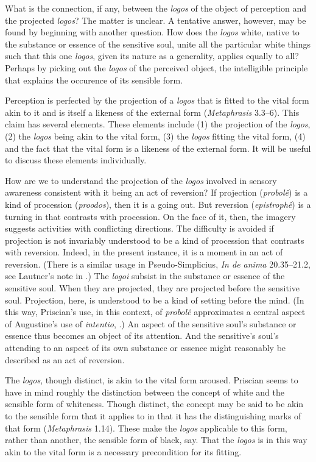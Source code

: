 \documentclass[12pt]{article}
\begin{document}
What is the connection, if any, between the \emph{logos} of the object of perception and the projected \emph{logos}? The matter is unclear. A tentative answer, however, may be found by beginning with another question. How does the \emph{logos} white, native to the substance or essence of the sensitive soul, unite all the particular white things such that this one \emph{logos}, given its nature as a generality, applies equally to all? Perhaps by picking out the \emph{logos} of the perceived object, the intelligible principle that explains the occurence of its sensible form.

Perception is perfected by the projection of a \emph{logos} that is fitted to the vital form akin to it and is itself a likeness of the external form (\emph{Metaphrasis} 3.3--6). This claim has several elements. These elements include (1) the projection of the \emph{logos}, (2) the \emph{logos} being akin to the vital form, (3) the \emph{logos} fitting the vital form, (4) and the fact that the vital form is a likeness of the external form. It will be useful to discuss these elements individually.

How are we to understand the projection of the \emph{logos} involved in sensory awareness consistent with it being an act of reversion? If projection (\emph{probolê}) is a kind of procession (\emph{proodos}), then it is a going out. But reversion (\emph{epistrophê}) is a turning in that contrasts with procession. On the face of it, then, the imagery suggests activities with conflicting directions. The difficulty is avoided if projection is not invariably understood to be a kind of procession that contrasts with reversion. Indeed, in the present instance, it is a moment in an act of reversion. (There is a similar usage in Pseudo-Simplicius, \emph{In de anima} 20.35--21.2, see Lautner's note in \citealt[164--165 n.94]{Urmson:2013vf}.) The \emph{logoi} subsist in the substance or essence of the sensitive soul. When they are projected, they are projected before the sensitive soul. Projection, here, is understood to be a kind of setting before the mind. (In this way, Priscian's use, in this context, of \emph{probolê} approximates a central aspect of Augustine's use of \emph{intentio}, \citealt[84--87]{ODaly:1987fq}.) An aspect of the sensitive soul's substance or essence thus becomes an object of its attention. And the sensitive's soul's attending to an aspect of its own substance or essence might reasonably be described as an act of reversion.

The \emph{logos}, though distinct, is akin to the vital form aroused. Priscian seems to have in mind roughly the distinction between the concept of white and the sensible form of whiteness. Though distinct, the concept may be said to be akin to the sensible form that it applies to in that it has the distinguishing marks of that form (\emph{Metaphrasis} 1.14). These make the \emph{logos} applicable to this form, rather than another, the sensible form of black, say. That the \emph{logos} is in this way akin to the vital form is a necessary precondition for its fitting.
\end{document}
